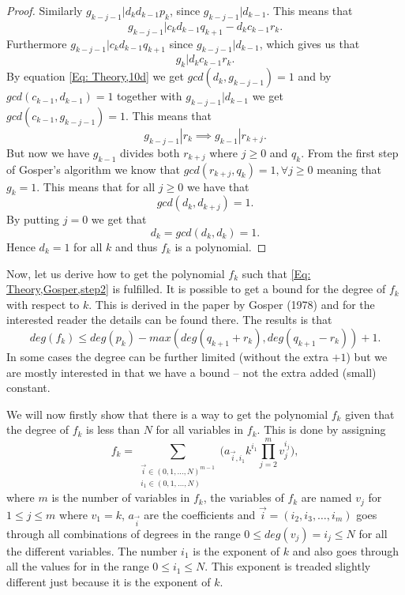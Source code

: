 \begin{proof}
  Similarly $g_{k-j-1}|d_kd_{k-1}p_k$, since $g_{k-j-1}|d_{k-1}$. This means that
  \begin{equation}
    g_{k-j-1}|c_kd_{k-1}q_{k+1}-d_kc_{k-1}r_k.
  \end{equation}
  Furthermore $g_{k-j-1}|c_kd_{k-1}q_{k+1}$ since $g_{k-j-1}|d_{k-1}$, which gives us that
  \begin{equation}
    g_k|d_kc_{k-1}r_k.
  \end{equation}
  By equation \ref{Eq: Theory,10d} we get $gcd(d_k,g_{k-j-1})=1$ and by $gcd(c_{k-1},d_{k-1})=1$ together with $g_{k-j-1}|d_{k-1}$ we get $gcd(c_{k-1},g_{k-j-1})=1$. This means that
  \begin{equation}
    g_{k-j-1}|r_k \implies g_{k-1}|r_{k+j}.
  \end{equation}
  But now we have $g_{k-1}$ divides both $r_{k+j}$ where $j\geq 0$ and $q_k$. From the first step of Gosper's algorithm we know that $gcd(r_{k+j},q_k)=1, \forall j\geq 0$ meaning that $g_k=1$. This means that for all $j\geq 0$ we have that
  \begin{equation}
    gcd(d_k,d_{k+j})=1.
  \end{equation}
  By putting $j=0$ we get that
  \begin{equation}
    d_k = gcd(d_k,d_k) = 1.
  \end{equation}
  Hence $d_k=1$ for all $k$ and thus $f_k$ is a polynomial.
\end{proof}

Now, let us derive how to get the polynomial $f_k$ such that \ref{Eq: Theory,Gosper,step2} is fulfilled. It is possible to get a bound for the degree of $f_k$ with respect to $k$. This is derived in the paper by Gosper (1978) and for the interested reader the details can be found there. The results is that
\begin{equation}
  deg(f_k)\leq deg(p_k) - max(deg(q_{k+1}+r_k),deg(q_{k+1}-r_k)) + 1.
\end{equation}
In some cases the degree can be further limited (without the extra $+1$) but we are mostly interested in that we have a bound -- not the extra added (small) constant.

We will now firstly show that there is a way to get the polynomial $f_k$ given that the degree of $f_k$ is less than $N$ for all variables in $f_k$. This is done by assigning
\begin{equation}\label{Eq: Theory,general polynomial}
  f_k = \sum_{\substack{\vec{i}\in (0,1,\ldots,N)^{m-1}\\i_1\in (0,1,\ldots,N)}} \Big(a_{\vec{i},i_1}k^{i_1}\prod_{j=2}^m v_j^{i_j}\Big),
\end{equation}
where $m$ is the number of variables in $f_k$, the variables of $f_k$ are named $v_j$ for $1\leq j\leq m$ where $v_1=k$, $a_\vec{i}$ are the coefficients and $\vec{i}=(i_2,i_3,\ldots,i_m)$ goes through all combinations of degrees in the range $0\leq deg(v_j)=i_j\leq N$ for all the different variables. The number $i_1$ is the exponent of $k$ and also goes through all the values for in the range $0\leq i_1\leq N$. This exponent is treaded slightly different just because it is the exponent of $k$.

